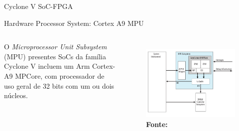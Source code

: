\documentclass[10pt]{beamer}
\begin{document}
\begin{frame}{Cyclone V SoC-FPGA}
	\begin{alertblock}{Hardware Processor System: Cortex A9 MPU}
		\begin{columns}
			O \textit{Microprocessor Unit Subsystem} (MPU) presentes SoCs da família Cyclone V incluem um Arm Cortex-A9 MPCore, com processador de uso geral de 32 bits com um ou dois núcleos.
			\begin{figure}[h]
				\begin{center}
					\includegraphics[scale=0.217]{imagens/mpusubsystem.png}\\
					{\footnotesize \textbf{Fonte:}}
				\end{center}
				\label{fig:cycloneV}
			\end{figure}
		\end{columns}
	\end{alertblock}
\end{frame}
\end{document}
